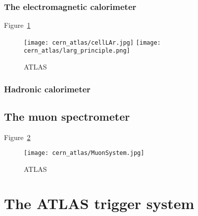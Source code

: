 \subsubsection{The electromagnetic calorimeter}
Figure~\ref{caloLAr}
\begin{figure}[htbp]
  \centering
  \texttt{[image: cern\_atlas/cellLAr.jpg]}
	\texttt{[image: cern\_atlas/larg\_principle.png]}
  \caption[ATLAS]{ATLAS}
  \label{caloLAr}
\end{figure}

\subsubsection{Hadronic calorimeter}


\subsection{The muon spectrometer}
Figure~\ref{MuonSys}
\begin{figure}[htbp]
  \centering
  \texttt{[image: cern\_atlas/MuonSystem.jpg]}
  \caption[ATLAS]{ATLAS}
  \label{MuonSys}
\end{figure}

\section{The ATLAS trigger system}
\section{}

